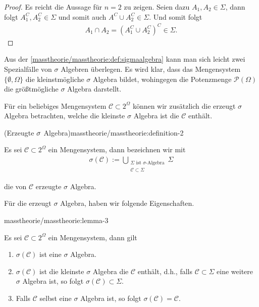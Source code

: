\documentclass[letterpaper,10pt,german]{jupyterBook}
\begin{document}
\begin{proof}
 Es reicht die Aussage für \(n=2\) zu zeigen. Seien dazu \(A_1,A_2\in\Sigma\), dann folgt \(A_1^C,A_2^C\in\Sigma\) und somit auch \(A^C\cup A_2^C\in\Sigma\). Und somit folgt
\begin{align*}
A_1\cap A_2 = (A_1^C\cup A_2^C)^C \in \Sigma.
\end{align*}\end{proof}

\par
Aus der \cref{masstheorie/masstheorie:def:sigmaalgebra} kann man sich leicht zwei Spezialfälle von \(\sigma\) Algebren überlegen.
Es wird klar, dass das Mengensystem \(\{\emptyset, \Omega\}\) die kleinstmögliche \(\sigma\) Algebra bildet, wohingegen die Potenzmenge \(\mathcal{P}(\Omega)\) die größtmögliche \(\sigma\) Algebra darstellt.

\par
Für ein beliebiges Mengensystem \(\mathcal{C}\subset 2^\Omega\) können wir zusätzlich die erzeugt \(\sigma\) Algebra betrachten, welche die kleinste \(\sigma\) Algebra ist die \(\mathcal{C}\) enthält.
\begin{definition}{(Erzeugte \protect\(\sigma\protect\) Algebra)}{masstheorie/masstheorie:definition-2}



\par
Es sei \(\mathcal{C}\subset 2^\Omega\) ein Mengensystem, dann bezeichnen wir mit
\begin{align*}
\sigma(\mathcal{C}) := \bigcup_{\substack{\Sigma \text{ ist $\sigma$-Algebra}\\ \mathcal{C} \subset \Sigma}} \Sigma
\end{align*}
\par
die von \(\mathcal{C}\) erzeugte \(\sigma\) Algebra.
\end{definition}

\par
Für die erzeugt \(\sigma\) Algebra, haben wir folgende Eigenschaften.
\begin{lemma}{}{masstheorie/masstheorie:lemma-3}



\par
Es sei \(\mathcal{C}\subset 2^\Omega\) ein Mengensystem, dann gilt
\begin{enumerate}

\item {} 
\par
\(\sigma(\mathcal{C})\) ist eine \(\sigma\) Algebra.

\item {} 
\par
\(\sigma(\mathcal{C})\) ist die kleinste \(\sigma\) Algebra die \(\mathcal{C}\) enthält, d.h., falls \(\mathcal{C}\subset\Sigma\) eine weitere \(\sigma\) Algebra ist, so folgt \(\sigma(\mathcal{C})\subset\Sigma\).

\item {} 
\par
Falls \(\mathcal{C}\) selbst eine \(\sigma\) Algebra ist, so folgt \(\sigma(\mathcal{C}) = \mathcal{C}\).

\end{enumerate}
\end{lemma}
\end{document}
